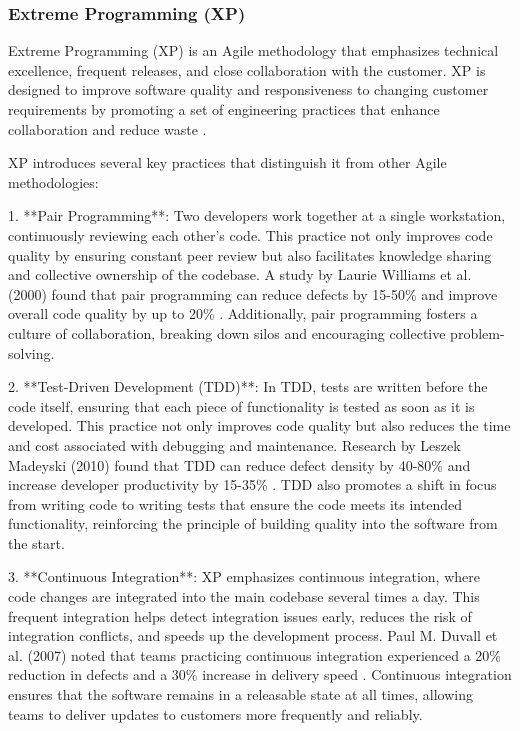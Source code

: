 \begin{refsection}
\subsubsection{Extreme Programming (XP)}

Extreme Programming (XP) is an Agile methodology that emphasizes technical excellence, frequent releases, and close collaboration with the customer. XP is designed to improve software quality and responsiveness to changing customer requirements by promoting a set of engineering practices that enhance collaboration and reduce waste \cite[pp.~1-5]{beck2021extreme}.

XP introduces several key practices that distinguish it from other Agile methodologies:

1. **Pair Programming**: Two developers work together at a single workstation, continuously reviewing each other’s code. This practice not only improves code quality by ensuring constant peer review but also facilitates knowledge sharing and collective ownership of the codebase. A study by Laurie Williams et al. (2000) found that pair programming can reduce defects by 15-50\% and improve overall code quality by up to 20\% \cite[pp.~19-25]{williams2000strengthening}. Additionally, pair programming fosters a culture of collaboration, breaking down silos and encouraging collective problem-solving.

2. **Test-Driven Development (TDD)**: In TDD, tests are written before the code itself, ensuring that each piece of functionality is tested as soon as it is developed. This practice not only improves code quality but also reduces the time and cost associated with debugging and maintenance. Research by Leszek Madeyski (2010) found that TDD can reduce defect density by 40-80\% and increase developer productivity by 15-35\% \cite[pp.~241-269]{madeyski2010impact}. TDD also promotes a shift in focus from writing code to writing tests that ensure the code meets its intended functionality, reinforcing the principle of building quality into the software from the start.

3. **Continuous Integration**: XP emphasizes continuous integration, where code changes are integrated into the main codebase several times a day. This frequent integration helps detect integration issues early, reduces the risk of integration conflicts, and speeds up the development process. Paul M. Duvall et al. (2007) noted that teams practicing continuous integration experienced a 20\% reduction in defects and a 30\% increase in delivery speed \cite[pp.~65-71]{duvall2007continuous}. Continuous integration ensures that the software remains in a releasable state at all times, allowing teams to deliver updates to customers more frequently and reliably.


\end{refsection}
